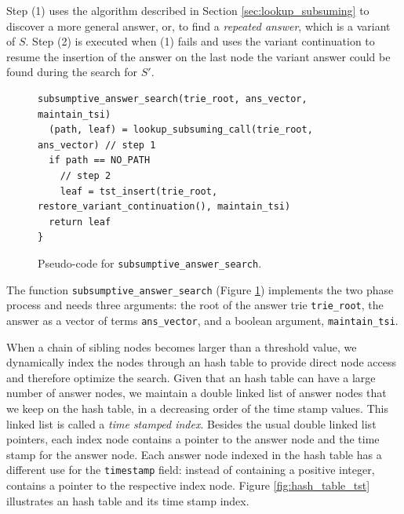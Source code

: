 Step (1) uses the algorithm described in Section \ref{sec:lookup_subsuming} to discover a more general answer, or,
to find a \textit{repeated answer}, which is a variant of $S$.
Step (2) is executed when (1) fails and uses the variant continuation to resume the insertion of the answer
on the last node the variant answer could be found during the search for $S'$.

\begin{figure}[ht]
\begin{Verbatim}
subsumptive_answer_search(trie_root, ans_vector, maintain_tsi)
  (path, leaf) = lookup_subsuming_call(trie_root, ans_vector) // step 1
  if path == NO_PATH
    // step 2
    leaf = tst_insert(trie_root, restore_variant_continuation(), maintain_tsi)
  return leaf
}
\end{Verbatim}
\caption{Pseudo-code for \texttt{subsumptive\_answer\_search}.}
\label{fig:subsumptive_answer_search}
\end{figure}

The function \texttt{subsumptive\_answer\_search} (Figure \ref{fig:subsumptive_answer_search})
implements the two phase process and needs three arguments: the root of the answer trie \texttt{trie\_root},
the answer as a vector of terms \texttt{ans\_vector}, and a boolean argument, \texttt{maintain\_tsi}.

When a chain of sibling nodes becomes larger than a threshold value, we dynamically index the nodes through an hash table to provide direct node access and therefore optimize the search. Given that an hash table
can have a large number of answer nodes, we maintain a double linked list of answer nodes that we keep on the hash
table, in a decreasing order of the time stamp values. This linked list is called a \textit{time stamped index}.
Besides the usual double linked list pointers, each index node contains a pointer to the answer node
and the time stamp for the answer node. Each answer node indexed in the hash table has a different use
for the \texttt{timestamp} field: instead of containing a positive integer, contains a pointer to the respective index node. Figure \ref{fig:hash_table_tst} illustrates an hash table and its time stamp index.

